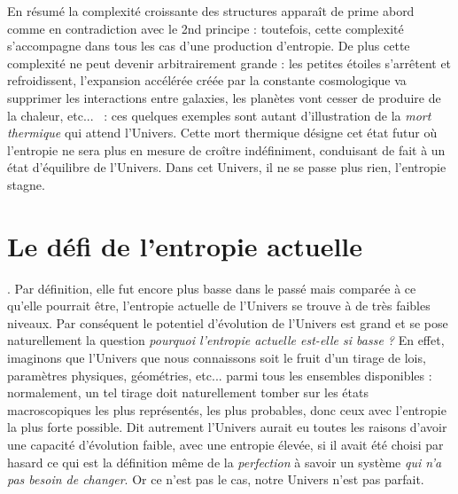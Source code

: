 En résumé la complexité croissante des structures apparaît de prime abord comme en contradiction avec le 2nd principe : toutefois, cette complexité s'accompagne dans tous les cas d'une production d'entropie. De plus cette complexité ne peut devenir arbitrairement grande : les petites étoiles s'arrêtent et refroidissent, l'expansion accélérée créée par la constante cosmologique va supprimer les interactions entre galaxies, les planètes vont cesser de produire de la chaleur, etc... ~: ces quelques exemples sont autant d'illustration de la \textit{mort thermique} qui attend l'Univers. Cette mort thermique désigne cet état futur où l'entropie ne sera plus en mesure de croître indéfiniment, conduisant de fait à un état d'équilibre de l'Univers. Dans cet Univers, il ne se passe plus rien, l'entropie stagne.

\section{Le défi de l'entropie actuelle}

. Par définition, elle fut encore plus basse dans le passé mais comparée à ce qu'elle pourrait être, l'entropie actuelle de l'Univers se trouve à de très faibles niveaux. Par conséquent le potentiel d'évolution de l'Univers est grand et se pose naturellement la question \textit{pourquoi l'entropie actuelle est-elle si basse ?} En effet, imaginons que l'Univers que nous connaissons soit le fruit d'un tirage de lois, paramètres physiques, géométries, etc... parmi tous les ensembles disponibles : normalement, un tel tirage doit naturellement tomber sur les états macroscopiques les plus représentés, les plus probables, donc ceux avec l'entropie la plus forte possible. Dit autrement l'Univers aurait eu toutes les raisons d'avoir une capacité d'évolution faible, avec une entropie élevée, si il avait été choisi par hasard ce qui est la définition même de la \textit{perfection} à savoir un système \textit{qui n'a pas besoin de changer}. Or ce n'est pas le cas, notre Univers n'est pas parfait.


